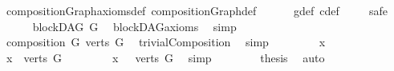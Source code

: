 \begin{isabellebody}
\ compositionGraph{\isacharunderscore}{\kern0pt}axioms{\isacharunderscore}{\kern0pt}def\ compositionGraph{\isacharunderscore}{\kern0pt}def\isanewline
\ \ \ \ \ \ g{\isacharprime}{\kern0pt}{\isacharunderscore}{\kern0pt}def\ c{\isacharunderscore}{\kern0pt}def\ \isanewline
\ \ \isamarkupfalse%
\ safe\isanewline
\ \ \ \ \isamarkupfalse%
\ {\isachardoublequoteopen}blockDAG\ G{\isachardoublequoteclose}\ \isamarkupfalse%
\ blockDAG{\isacharunderscore}{\kern0pt}axioms\ \isamarkupfalse%
\ simp\isanewline
\ \ \isamarkupfalse%
\ \isanewline
\ \ \ \ \isamarkupfalse%
\ {\isachardoublequoteopen}composition\ G\ {\isacharparenleft}{\kern0pt}verts\ G{\isacharparenright}{\kern0pt}{\isachardoublequoteclose}\ \isamarkupfalse%
\ trivialComposition\ \isamarkupfalse%
\ simp\isanewline
\ \ \isamarkupfalse%
\isanewline
\ \ \ \ \isamarkupfalse%
\ x\ \ \ \isanewline
\ \ \ \ \isamarkupfalse%
\ {\isachardoublequoteopen}x\ {\isasymin}\ verts\ G{\isachardoublequoteclose}\isanewline
\ \ \ \ \isamarkupfalse%
\ \isamarkupfalse%
\ {\isachardoublequoteopen}\ x\ {\isasymin}\ {\isasymUnion}\ {\isacharbraceleft}{\kern0pt}verts\ G{\isacharbraceright}{\kern0pt}{\isachardoublequoteclose}\ \isamarkupfalse%
\ simp\isanewline
\ \ \isamarkupfalse%
\isanewline
\ \ \isamarkupfalse%
\ \isamarkupfalse%
\ {\isachardoublequoteopen}{\isacharquery}{\kern0pt}thesis{\isachardoublequoteclose}\ \isamarkupfalse%
\ auto\isanewline
{}\isamarkupfalse%
%
\endisatagproof
{\isafoldproof}%
%
\isadelimproof
\isanewline
%
\endisadelimproof
%
\isadelimtheory
%
\endisadelimtheory
%
\isatagtheory
{}\isamarkupfalse%
%
\endisatagtheory
{\isafoldtheory}%
%
\isadelimtheory
%
\endisadelimtheory
%
\end{isabellebody}%
\endinput
